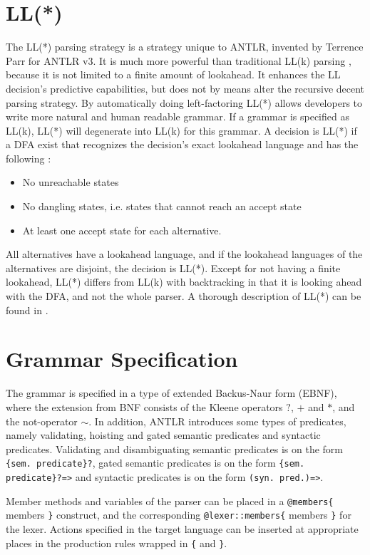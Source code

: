 \section{LL(*)}
The LL(*) parsing strategy is a strategy unique to ANTLR, invented by Terrence Parr for ANTLR v3. It is much more powerful than traditional LL(k) parsing \cite{definitiveAntlr}, because it is not limited to a finite amount of lookahead. It enhances the LL decision's predictive capabilities, but does not by means alter the recursive decent parsing strategy.  By automatically doing left-factoring LL(*) allows developers to write more natural and human readable grammar. If a grammar is specified as LL(k), LL(*) will degenerate into LL(k) for this grammar. A decision is LL(*) if a DFA exist that recognizes the decision's exact lookahead language and has the following \cite{definitiveAntlr}:
\begin{itemize}
\item No unreachable states
\item No dangling states, i.e. states that cannot reach an accept state
\item At least one accept state for each alternative.
\end{itemize}
All alternatives have a lookahead language, and if the lookahead languages of the alternatives are disjoint, the decision is LL(*). Except for not having a finite lookahead, LL(*) differs from LL(k) with backtracking in that it is looking ahead with the DFA, and not the whole parser. A thorough description of LL(*) can be found in \cite{lookahead}.

\section{Grammar Specification}
\label{sect:antlr:grammarSpec}
The grammar is specified in a type of extended Backus-Naur form (EBNF), where the extension from BNF consists of the Kleene operators $?$, $ +$ and $\ast$, and the not-operator $\sim$.  In addition, ANTLR introduces some types of predicates, namely validating, hoisting and gated semantic predicates and syntactic predicates. Validating and disambiguating semantic predicates is on the form \verb!{sem. predicate}?!, gated semantic predicates is on the form \verb!{sem. predicate}?=>! and syntactic predicates is on the form \verb!(syn. pred.)=>!.

Member methods and variables of the parser can be placed in a \verb!@members{! members \verb!}! construct, and the corresponding \verb!@lexer::members{! members \verb!}! for the lexer. Actions specified in the target language can be inserted at appropriate places in the production rules wrapped in \verb!{! and \verb!}!. 


